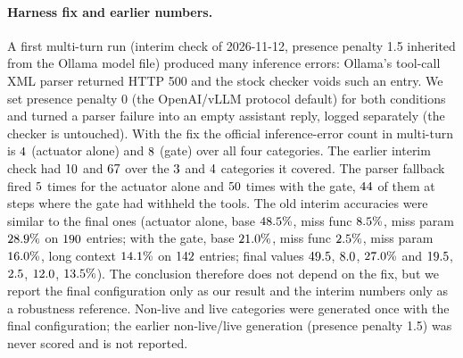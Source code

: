 \documentclass[10pt]{article}
\begin{document}
\paragraph{Harness fix and earlier numbers.} A first multi-turn run (interim check of 2026-11-12, presence penalty 1.5 inherited from the Ollama model file) produced many inference errors: Ollama's tool-call XML parser returned HTTP 500 and the stock checker voids such an entry. We set presence penalty 0 (the OpenAI/vLLM protocol default) for both conditions and turned a parser failure into an empty assistant reply, logged separately (the checker is untouched). With the fix the official inference-error count in multi-turn is $4$ (actuator alone) and $8$ (gate) over all four categories. The earlier interim check had $10$ and $67$ over the $3$ and $4$ categories it covered. The parser fallback fired $5$ times for the actuator alone and $50$ times with the gate, $44$ of them at steps where the gate had withheld the tools. The old interim accuracies were similar to the final ones (actuator alone, base $48.5\%$, miss func $8.5\%$, miss param $28.9\%$ on $190$ entries; with the gate, base $21.0\%$, miss func $2.5\%$, miss param $16.0\%$, long context $14.1\%$ on $142$ entries; final values $49.5$, $8.0$, $27.0\%$ and $19.5$, $2.5$, $12.0$, $13.5\%$). The conclusion therefore does not depend on the fix, but we report the final configuration only as our result and the interim numbers only as a robustness reference. Non-live and live categories were generated once with the final configuration; the earlier non-live/live generation (presence penalty 1.5) was never scored and is not reported.

\begin{table}[t]
\centering
\scriptsize
\setlength{\tabcolsep}{4pt}
\caption{Official BFCL v4 on a local Qwen3.5-9B actuator with and without the GNCA respond gate, one run per condition, presence penalty 0. $p$: two-sided exact McNemar test on the entries where exactly one condition is correct (unadjusted). $^a$ Multi-turn: official \texttt{inference\_error}; other categories: requests that timed out (recorded in the result file). $^b$ Official \texttt{empty\_turn\_model\_response} (multi-turn only). $^c$ Decision steps in which the gate withheld the tools (entries with at least one such step). Memory rows count the three backends separately. All values are generated from the official score files. Source S9 (Table~\ref{tab:sources}).}
\label{tab:bfcl-official}

\end{table}
\end{document}
